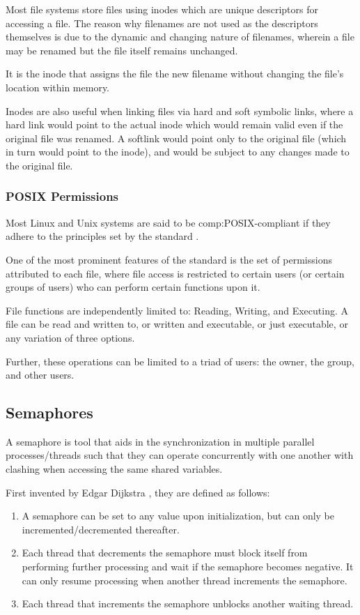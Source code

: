 Most file systems store files using inodes which are unique descriptors for accessing a file. The reason why filenames are not used as the descriptors themselves is due to the dynamic and changing nature of filenames, wherein a file may be renamed but the file itself remains unchanged. 

It is the inode that assigns the file the new filename without changing the file's location within memory.

Inodes are also useful when linking files via hard and soft symbolic links, where a hard link would point to the actual inode  which would remain valid even if the original file was renamed. A softlink would point only to the original file (which in turn would point to the inode), and would be subject to any changes made to the original file.


\subsubsection{POSIX Permissions}

Most Linux and Unix systems are said to be \gls{comp:POSIX}-compliant if they adhere to the principles set by the standard \cite{walli1995posix}.

One of the most  prominent features of the standard is the set of permissions attributed to each file, where file access is restricted to certain users (or certain groups of users) who can perform certain functions upon it.

File functions are independently limited to: Reading, Writing, and Executing. A file can be read and written to, or written and executable, or just executable, or any variation of three options.

Further, these operations can be limited to a triad of users: the owner, the group, and other users.


\subsection{Semaphores}\label{ref:app:semaphores}

A semaphore is tool that aids in the synchronization in multiple parallel processes/threads such that they can operate concurrently with one another with clashing when accessing the same shared variables.

First invented by Edgar Dijkstra \cite{dijkstra1968cooperating}, they are defined as follows:

\begin{enumerate}
\item{A semaphore can be set to any value upon initialization, but can only be incremented/decremented thereafter.}
\item{Each thread that decrements the semaphore must block itself from performing further processing and wait if the semaphore becomes negative. It can only resume processing when another thread increments the semaphore.}
\item{Each thread that increments the semaphore unblocks another waiting thread.}
\end{enumerate}

